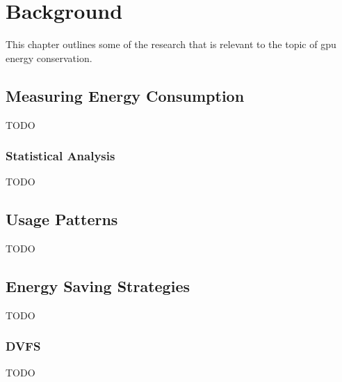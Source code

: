 \chapter{Background}
	This chapter outlines some of the research that is relevant to the topic of \gls{gpu} energy conservation.

	\section{Measuring Energy Consumption}
		TODO

		\subsection{Statistical Analysis}
			TODO

	\section{Usage Patterns}
		TODO

	\section{Energy Saving Strategies}
		TODO

		\subsection{DVFS}
			TODO